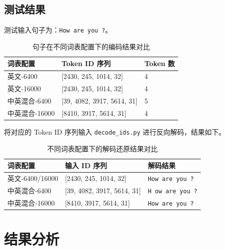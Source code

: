\documentclass[a4paper,12pt]{ctexart} %
\begin{document}
\subsection{测试结果}

测试输入句子为：\texttt{How are you ?}。

\begin{table}[H]
    \centering
    \begin{tabular}{p{} p{} p{}}
        \toprule
        词表配置 & Token ID 序列 & Token 数 \\
        \midrule
        英文-6400 & [2430, 245, 1014, 32] & 4 \\
        英文-16000 & [2430, 245, 1014, 32] & 4 \\
        中英混合-6400 & [39, 4082, 3917, 5614, 31] & 5 \\
        中英混合-16000 & [8410, 3917, 5614, 31] & 4 \\
        \bottomrule
    \end{tabular}
    \caption{句子在不同词表配置下的编码结果对比}
\end{table}

将对应的 Token ID 序列输入 \texttt{decode\_ids.py} 进行反向解码，结果如下。

\begin{table}[H]
    \centering
    \begin{tabular}{p{} p{} p{}}
        \toprule
        词表配置 & 输入 ID 序列 & 解码结果 \\
        \midrule
        英文-6400/16000 & [2430, 245, 1014, 32] & \texttt{How are you ?} \\
        中英混合-6400 & [39, 4082, 3917, 5614, 31] & \texttt{H ow are you ?} \\
        中英混合-16000 & [8410, 3917, 5614, 31] & \texttt{How are you ?} \\
        \bottomrule
    \end{tabular}
    \caption{不同词表配置下的解码还原结果对比}
\end{table}





\section{结果分析}
\end{document}

